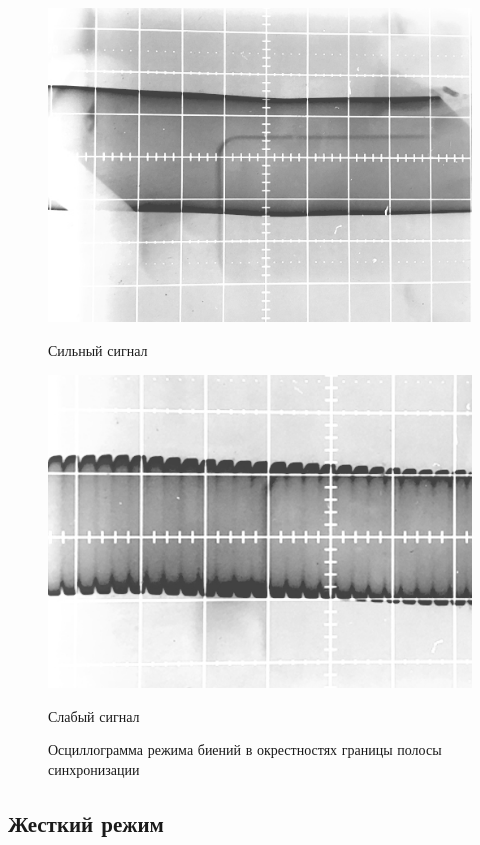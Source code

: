 \begin{figure}[H]
	\begin{minipage}{.45\linewidth}
		\centering
		\includegraphics[width=\linewidth]{img/5s.jpg}
		\caption*{Сильный сигнал}
	\end{minipage}
	\begin{minipage}{.45\linewidth}
		\centering
		\includegraphics[width=\linewidth]{img/6s.jpg}
		\caption*{Слабый сигнал}
	\end{minipage}
	\caption{Осциллограмма режима биений в окрестностях границы полосы синхронизации}
	\label{fig:7}
\end{figure}

\subsection*{Жесткий режим}
